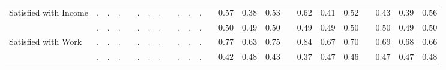 \begin{center}
{\begin{longtable}{L{12em} c c c p{1.2em} c c c p{1.2em} c c c p{1.2em} c c c p{1.2em} c c c p{1.2em} c c c}
Satisfied with Income & . &         . &         . & &         . &         . &         . & &         . &         . &         . & &      0.57 &      0.38 &      0.53 & &      0.62 &      0.41 &      0.52 & &      0.43 &      0.39 &      0.56 \\*
& $\mathit{        .}$ & $\mathit{        .}$ & $\mathit{        .}$ & & $\mathit{        .}$ & $\mathit{        .}$ & $\mathit{        .}$ & & $\mathit{        .}$ & $\mathit{        .}$ & $\mathit{        .}$ & & $\mathit{     0.50}$ & $\mathit{     0.49}$ & $\mathit{     0.50}$ & & $\mathit{     0.49}$ & $\mathit{     0.49}$ & $\mathit{     0.50}$ & & $\mathit{     0.50}$ & $\mathit{     0.49}$ & $\mathit{     0.50}$ \\[.7em]
Satisfied with Work & . &         . &         . & &         . &         . &         . & &         . &         . &         . & &      0.77 &      0.63 &      0.75 & &      0.84 &      0.67 &      0.70 & &      0.69 &      0.68 &      0.66 \\*
& $\mathit{        .}$ & $\mathit{        .}$ & $\mathit{        .}$ & & $\mathit{        .}$ & $\mathit{        .}$ & $\mathit{        .}$ & & $\mathit{        .}$ & $\mathit{        .}$ & $\mathit{        .}$ & & $\mathit{     0.42}$ & $\mathit{     0.48}$ & $\mathit{     0.43}$ & & $\mathit{     0.37}$ & $\mathit{     0.47}$ & $\mathit{     0.46}$ & & $\mathit{     0.47}$ & $\mathit{     0.47}$ & $\mathit{     0.48}$ \\[.7em]
\hline
\end{longtable}
}
\end{center}
